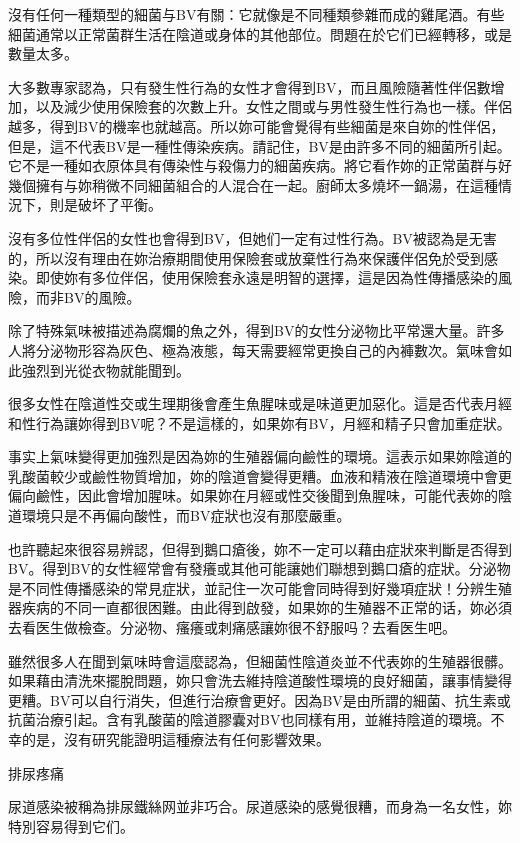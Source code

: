\documentclass[12pt,UTF8]{ctexbook}
\begin{document}
沒有任何一種類型的細菌与BV有關：它就像是不同種類參雜而成的雞尾酒。有些細菌通常以正常菌群生活在陰道或身体的其他部位。問題在於它们已經轉移，或是數量太多。

大多數專家認為，只有發生性行為的女性才會得到BV，而且風險隨著性伴侶數增加，以及減少使用保險套的次數上升。女性之間或与男性發生性行為也一樣。伴侶越多，得到BV的機率也就越高。所以妳可能會覺得有些細菌是來自妳的性伴侶，但是，這不代表BV是一種性傳染疾病。請記住，BV是由許多不同的細菌所引起。它不是一種如衣原体具有傳染性与殺傷力的細菌疾病。將它看作妳的正常菌群与好幾個擁有与妳稍微不同細菌組合的人混合在一起。廚師太多燒坏一鍋湯，在這種情況下，則是破坏了平衡。

沒有多位性伴侶的女性也會得到BV，但她们一定有过性行為。BV被認為是无害的，所以沒有理由在妳治療期間使用保險套或放棄性行為來保護伴侶免於受到感染。即使妳有多位伴侶，使用保險套永遠是明智的選擇，這是因為性傳播感染的風險，而非BV的風險。

除了特殊氣味被描述為腐爛的魚之外，得到BV的女性分泌物比平常還大量。許多人將分泌物形容為灰色、極為液態，每天需要經常更換自己的內褲數次。氣味會如此強烈到光從衣物就能聞到。

很多女性在陰道性交或生理期後會產生魚腥味或是味道更加惡化。這是否代表月經和性行為讓妳得到BV呢？不是這樣的，如果妳有BV，月經和精子只會加重症狀。

事实上氣味變得更加強烈是因為妳的生殖器偏向鹼性的環境。這表示如果妳陰道的乳酸菌較少或鹼性物質增加，妳的陰道會變得更糟。血液和精液在陰道環境中會更偏向鹼性，因此會增加腥味。如果妳在月經或性交後聞到魚腥味，可能代表妳的陰道環境只是不再偏向酸性，而BV症狀也沒有那麼嚴重。

也許聽起來很容易辨認，但得到鵝口瘡後，妳不一定可以藉由症狀來判斷是否得到BV。得到BV的女性經常會有發癢或其他可能讓她们聯想到鵝口瘡的症狀。分泌物是不同性傳播感染的常見症狀，並記住一次可能會同時得到好幾項症狀！分辨生殖器疾病的不同一直都很困難。由此得到啟發，如果妳的生殖器不正常的话，妳必須去看医生做檢查。分泌物、瘙癢或刺痛感讓妳很不舒服吗？去看医生吧。

雖然很多人在聞到氣味時會這麼認為，但細菌性陰道炎並不代表妳的生殖器很髒。如果藉由清洗來擺脫問題，妳只會洗去維持陰道酸性環境的良好細菌，讓事情變得更糟。BV可以自行消失，但進行治療會更好。因為BV是由所謂的細菌、抗生素或抗菌治療引起。含有乳酸菌的陰道膠囊对BV也同樣有用，並維持陰道的環境。不幸的是，沒有研究能證明這種療法有任何影響效果。





排尿疼痛




尿道感染被稱為排尿鐵絲网並非巧合。尿道感染的感覺很糟，而身為一名女性，妳特別容易得到它们。
\end{document}
